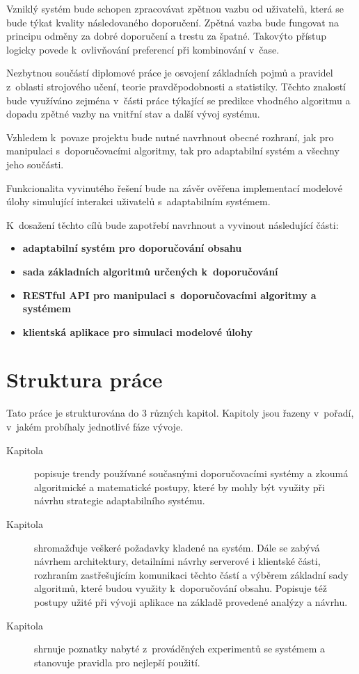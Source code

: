 \documentclass[thesis=M,czech]{FITthesis}[2014/05/07]
\begin{document}
\begin{introduction}
	Vzniklý systém bude schopen zpracovávat zpětnou vazbu od uživatelů, která se bude týkat kvality následovaného doporučení. Zpětná vazba bude fungovat na principu odměny za dobré doporučení a trestu za špatné. Takovýto přístup logicky povede k~ovlivňování preferencí při kombinování v~čase.
		
	Nezbytnou součástí diplomové práce je osvojení základních pojmů a pravidel z~oblasti strojového učení, teorie pravděpodobnosti a statistiky. Těchto znalostí bude využíváno zejména v~části práce týkající se predikce vhodného algoritmu a dopadu zpětné vazby na vnitřní stav a další vývoj systému. 
	
	Vzhledem k~povaze projektu bude nutné navrhnout obecné rozhraní, jak pro manipulaci s~doporučovacími algoritmy, tak pro adaptabilní systém a všechny jeho součásti.
	
	Funkcionalita vyvinutého řešení bude na závěr ověřena implementací modelové úlohy simulující interakci uživatelů s~adaptabilním systémem. 
	
	K~dosažení těchto cílů bude zapotřebí navrhnout a vyvinout následující části:

\begin{itemize}
  \item \textbf{adaptabilní systém pro doporučování obsahu}
  \item \textbf{sada základních algoritmů určených k~doporučování}
  \item \textbf{RESTful API pro manipulaci s~doporučovacími algoritmy a systémem}
  \item \textbf{klientská aplikace pro simulaci modelové úlohy}  
\end{itemize}	

\section{Struktura práce}
\label{sec:structure}
	Tato práce je strukturována do 3 různých kapitol. Kapitoly jsou řazeny v~pořadí, v~jakém probíhaly jednotlivé fáze vývoje.	

\begin{description}
  \item[Kapitola ] popisuje trendy používané současnými doporučovacími systémy a zkoumá algoritmické a matematické postupy, které by mohly být využity při návrhu strategie adaptabilního systému.
  \item[Kapitola ] shromažďuje veškeré požadavky kladené na systém. Dále se zabývá návrhem architektury, detailními návrhy serverové i klientské části, rozhraním zastřešujícím komunikaci těchto částí a výběrem základní sady algoritmů, které budou využity k~doporučování obsahu. Popisuje též postupy užité při vývoji aplikace na základě provedené analýzy a návrhu.
  \item[Kapitola ] shrnuje poznatky nabyté z~prováděných experimentů se systémem a stanovuje pravidla pro nejlepší použití.
\end{description}
	
\end{introduction}
\end{document}
